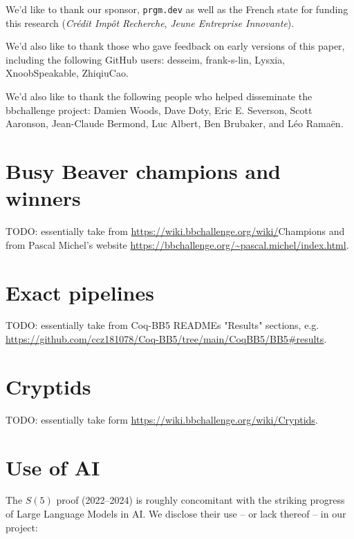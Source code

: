 \documentclass[a4paper,british]{article}
\theoremstyle{definition} %
\numberwithin{equation}{section}
\theoremstyle{definition} %
\newcommand{\ts}[1]{{\color{red}#1}}
\newcommand{\CoqBB}{Coq-BB5\xspace}
\begin{document}
We'd like to thank our sponsor, \texttt{prgm.dev} as well as the French state for funding this research (\textit{Crédit Impôt Recherche}, \textit{Jeune Entreprise Innovante}).

We'd also like to thank those who gave feedback on early versions of this paper, including the following GitHub users: desseim, frank-s-lin, Lysxia, XnoobSpeakable, ZhiqiuCao.

We'd also like to thank the following people who helped disseminate the bbchallenge project: Damien Woods, Dave Doty, Eric E. Severson, Scott Aaronson, Jean-Claude Bermond, Luc Albert, Ben Brubaker, and Léo Ramaën.
\newpage
\section{Busy Beaver champions and winners}\label{app:lowerbounds}

\ts{TODO: essentially take from \url{https://wiki.bbchallenge.org/wiki/}Champions and from Pascal Michel's website \url{https://bbchallenge.org/~pascal.michel/index.html}.}

\section{Exact pipelines}\label{app:pipelines}

\ts{TODO: essentially take from \CoqBB READMEs "Results" sections, e.g. \url{https://github.com/ccz181078/Coq-BB5/tree/main/CoqBB5/BB5\#results}.}

\section{Cryptids}\label{app:cryptids}

\ts{TODO: essentially take form \url{https://wiki.bbchallenge.org/wiki/Cryptids}.}

\section{Use of AI}

The $S(5)$ proof (2022--2024) is roughly concomitant with the striking progress of Large Language Models in AI. We disclose their use -- or lack thereof -- in our project:
\end{document}
